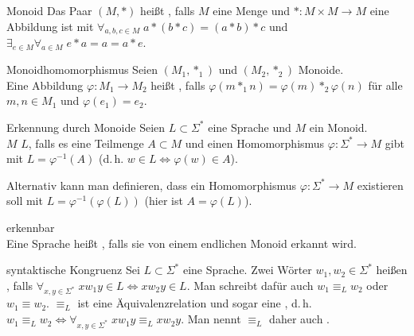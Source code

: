 \begin{Def}{Monoid}
    Das Paar $(M, \ast)$ heißt , falls
    $M$ eine Menge und
    $\ast\colon M \times M \rightarrow M$ eine Abbildung ist mit
    $\forall_{a, b, c \in M}\;
    a \ast (b \ast c) = (a \ast b) \ast c$ und
    $\exists_{e \in M} \forall_{a \in M}\; e \ast a = a = a \ast e$.
\end{Def}

\begin{Def}{Monoidhomomorphismus}
    Seien $(M_1, \ast_1)$ und $(M_2, \ast_2)$ Monoide.\\
    Eine Abbildung $\varphi\colon M_1 \rightarrow M_2$ heißt
    , falls
    $\varphi(m \ast_1 n) = \varphi(m) \ast_2 \varphi(n)$ für alle
    $m, n \in M_1$ und $\varphi(e_1) = e_2$.
\end{Def}

\begin{Def}{Erkennung durch Monoide}
    Seien $L \subset \Sigma^\ast$ eine Sprache und $M$ ein Monoid.\\
    $M$  $L$, falls es eine Teilmenge $A \subset M$ und
    einen Homomorphismus $\varphi\colon \Sigma^\ast \rightarrow M$
    gibt mit $L = \varphi^{-1}(A)$
    (d.\,h. $w \in L \iff \varphi(w) \in A$).
\end{Def}

\begin{Bem}
    Alternativ kann man definieren, dass
    ein Homomorphismus $\varphi\colon \Sigma^\ast \rightarrow M$ existieren
    soll mit $L = \varphi^{-1}(\varphi(L))$
    (hier ist $A = \varphi(L)$).
\end{Bem}

\begin{Def}{erkennbar}\\
    Eine Sprache heißt , falls sie von einem endlichen
    Monoid erkannt wird.
\end{Def}

\linie

\begin{Def}{syntaktische Kongruenz}
    Sei $L \subset \Sigma^\ast$ eine Sprache.
    Zwei Wörter $w_1, w_2 \in \Sigma^\ast$ heißen ,
    falls $\forall_{x, y \in \Sigma^\ast}\;
    x w_1 y \in L \iff x w_2 y \in L$.
    Man schreibt dafür auch $w_1 \equiv_L w_2$ oder $w_1 \equiv w_2$.
    $\equiv_L$ ist eine Äquivalenzrelation und sogar eine ,
    d.\,h.\\
    $w_1 \equiv_L w_2 \iff
    \forall_{x, y \in \Sigma^\ast}\; x w_1 y \equiv_L x w_2 y$.
    Man nennt $\equiv_L$ daher auch .
\end{Def}

